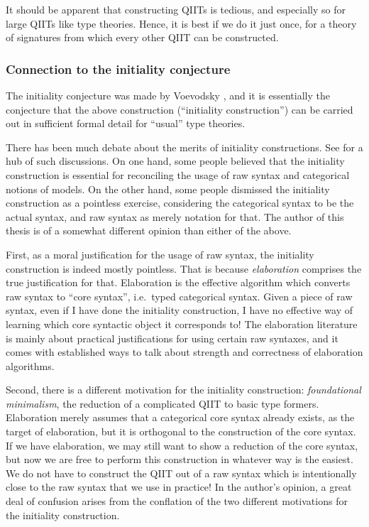 \documentclass[12pt,a4paper,twoside,openany]{book}
\theoremstyle{remark}
\theoremstyle{definition}
\theoremstyle{theorem}
\begin{document}
It should be apparent that constructing QIITs is tedious, and especially so for
large QIITs like type theories. Hence, it is best if we do it just once, for a
theory of signatures from which every other QIIT can be constructed.

\subsubsection{Connection to the initiality conjecture}

The initiality conjecture was made by Voevodsky \cite{voevodsky-initiality}, and
it is essentially the conjecture that the above construction (``initiality
construction'') can be carried out in sufficient formal detail for ``usual''
type theories.

There has been much debate about the merits of initiality constructions. See
\cite{initiality-project} for a hub of such discussions.  On one hand, some
people believed that the initiality construction is essential for reconciling
the usage of raw syntax and categorical notions of models. On the other hand,
some people dismissed the initiality construction as a pointless exercise,
considering the categorical syntax to be the actual syntax, and raw syntax as
merely notation for that. The author of this thesis is of a somewhat different
opinion than either of the above.

First, as a moral justification for the usage of raw syntax, the initiality
construction is indeed mostly pointless. That is because \emph{elaboration}
comprises the true justification for that. Elaboration is the effective
algorithm which converts raw syntax to ``core syntax'', i.e.\ typed categorical
syntax. Given a piece of raw syntax, even if I have done the initiality
construction, I have no effective way of learning which core syntactic object it
corresponds to!  The elaboration literature is mainly about practical
justifications for using certain raw syntaxes, and it comes with established
ways to talk about strength and correctness of elaboration algorithms.

Second, there is a different motivation for the initiality construction:
\emph{foundational minimalism}, the reduction of a complicated QIIT to basic
type formers. Elaboration merely assumes that a categorical core syntax already
exists, as the target of elaboration, but it is orthogonal to the construction of
the core syntax. If we have elaboration, we may still want to show a reduction
of the core syntax, but now we are free to perform this construction in whatever
way is the easiest. We do not have to construct the QIIT out of a raw syntax
which is intentionally close to the raw syntax that we use in practice! In the
author's opinion, a great deal of confusion arises from the conflation of the
two different motivations for the initiality construction.
\end{document}
